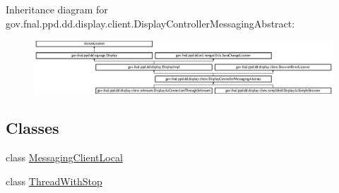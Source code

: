 \begin{DoxyItemize}
\end{DoxyItemize}Inheritance diagram for gov.\-fnal.\-ppd.\-dd.\-display.\-client.\-Display\-Controller\-Messaging\-Abstract\-:\begin{figure}[H]
\begin{center}
\leavevmode
\includegraphics[height=2.015839cm]{classgov_1_1fnal_1_1ppd_1_1dd_1_1display_1_1client_1_1DisplayControllerMessagingAbstract}
\end{center}
\end{figure}
\subsection*{Classes}
\begin{DoxyCompactItemize}
\item 
class \hyperlink{classgov_1_1fnal_1_1ppd_1_1dd_1_1display_1_1client_1_1DisplayControllerMessagingAbstract_1_1MessagingClientLocal}{Messaging\-Client\-Local}
\item 
class \hyperlink{classgov_1_1fnal_1_1ppd_1_1dd_1_1display_1_1client_1_1DisplayControllerMessagingAbstract_1_1ThreadWithStop}{Thread\-With\-Stop}
\end{DoxyCompactItemize}
